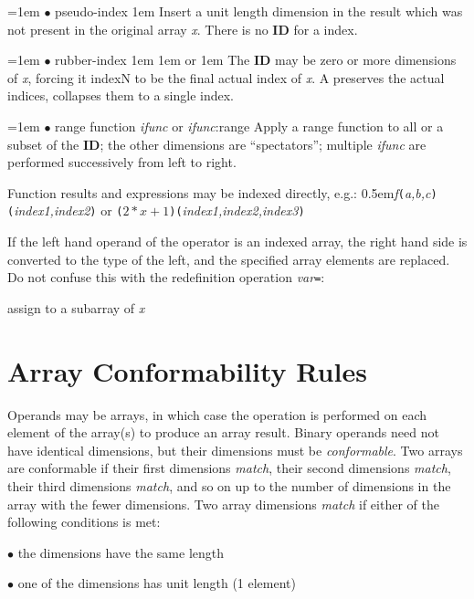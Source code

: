 \hangindent=1em
$\bullet$ pseudo-index \hglue 1em \kbd{-} \hfil\break
Insert a unit length dimension in the result which was not present in the 
original array {\it x}.  There is no {\bf ID} for a \kbd{-} index.

\hangindent=1em
$\bullet$ rubber-index \hglue 1em  \hglue 1em or
                       \hglue 1em \kbd{*} \hfil\break
The {\bf ID} may be zero or more dimensions of {\it x}, forcing {it indexN\/}
to be the final actual index of {\it x}.  A  preserves the actual
indices, \kbd{*} collapses them to a single index.

\hangindent=1em
$\bullet$ range function {\it ifunc\/} or {\it ifunc\/}:range \hfil\break
Apply a range function to all or a subset of the {\bf ID}; the other
dimensions are ``spectators''; multiple {\it ifunc\/} are performed
successively from left to right.

Function results and expressions may be indexed directly, e.g.:
\hfil\break
\hglue0.5em{\it f\/}{\tt (}{\it a,b,c\/}{\tt )(}{\it index1,index2\/}{\tt )}
or
{\tt (}$2*x+1${\tt )(}{\it index1,index2,index3\/}{\tt )}

If the left hand operand of the \kbd{=} operator is an indexed array, the
right hand side is converted to the type of the left, and the specified
array elements are replaced.  Do not confuse this with the redefinition
operation {\it var}{\tt =}:

       {assign to a subarray of {\it x}}

\section{Array Conformability Rules}

Operands may be arrays, in which case the operation is performed on
each element of the array(s) to produce an array result.  Binary
operands need not have identical dimensions, but their dimensions must
be {\it conformable}.  Two arrays are conformable if their first
dimensions {\it match}, their second dimensions {\it match}, their
third dimensions {\it match}, and so on up to the number of dimensions in
the array with the fewer dimensions.  Two array dimensions {\it match\/}
if either of the following conditions is met:

$\bullet$ the dimensions have the same length

$\bullet$ one of the dimensions has unit length (1 element)

